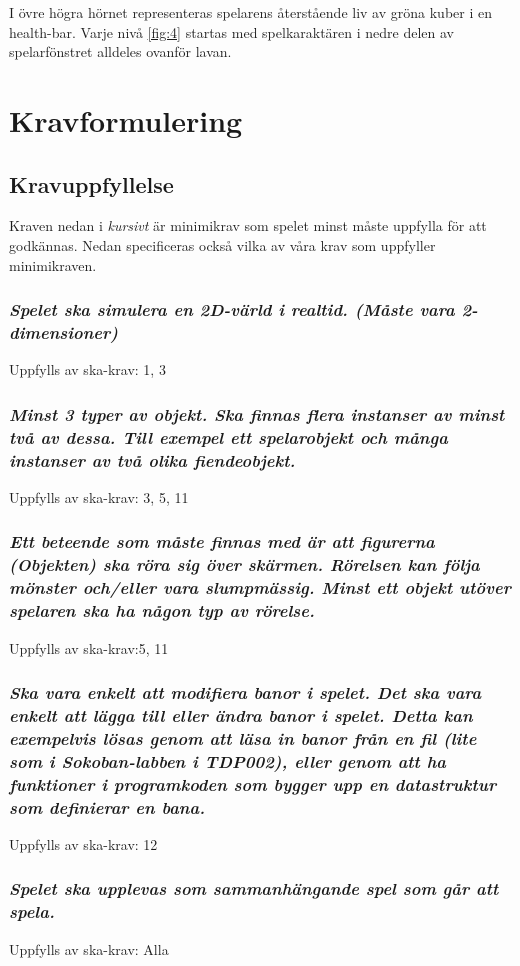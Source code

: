 \documentclass{TDP005mall}
\begin{document}
I övre högra hörnet representeras spelarens återstående liv av gröna kuber i en health-bar. Varje nivå \ref{fig:4} startas med spelkaraktären i nedre delen av spelarfönstret alldeles ovanför lavan.  

\section{Kravformulering}
\subsection{Kravuppfyllelse}
Kraven nedan i \emph{kursivt} är minimikrav som spelet minst måste uppfylla för att godkännas. Nedan specificeras också vilka av våra krav som uppfyller minimikraven.

\subsubsection{\emph{ Spelet ska simulera en 2D-värld i realtid. (Måste vara 2-dimensioner)}}
Uppfylls av ska-krav: 1, 3

\subsubsection{\emph{ Minst 3 typer av objekt. Ska finnas flera instanser av minst två av dessa. Till exempel ett spelarobjekt och många instanser av två olika fiendeobjekt.}}
Uppfylls av ska-krav: 3, 5, 11

\subsubsection{\emph{ Ett beteende som måste finnas med är att figurerna (Objekten) ska röra sig över skärmen. Rörelsen kan följa mönster och/eller vara slumpmässig. Minst ett objekt utöver spelaren ska ha någon typ av rörelse.}}
Uppfylls av ska-krav:5, 11

\subsubsection{\emph{ Ska vara enkelt att modifiera banor i spelet. Det ska vara enkelt att lägga till eller ändra banor i spelet. Detta kan exempelvis lösas genom att läsa in banor från en fil (lite som i Sokoban-labben i TDP002), eller genom att ha funktioner i programkoden som bygger upp en datastruktur som definierar en bana. }}
Uppfylls av ska-krav: 12

\subsubsection{\emph{ Spelet ska upplevas som sammanhängande spel som går att spela.}}
Uppfylls av ska-krav: Alla
\end{document}
